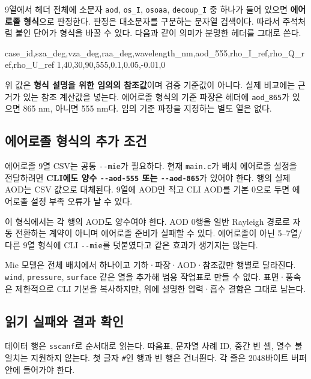 9열에서 헤더 전체에 소문자 \texttt{aod}, \texttt{os\_\allowbreak{}I}, \texttt{osoaa}, \texttt{decoup\_\allowbreak{}I} 중 하나가 들어 있으면 \textbf{에어로졸 형식}으로 판정한다. 판정은 대소문자를 구분하는 문자열 검색이다. 따라서 주석처럼 붙인 단어가 형식을 바꿀 수 있다. 다음과 같이 의미가 분명한 헤더를 그대로 쓴다.


\begin{ManualCode}
case_id,sza_deg,vza_deg,raa_deg,wavelength_nm,aod_555,rho_I_ref,rho_Q_ref,rho_U_ref
1,40,30,90,555,0.1,0.05,-0.01,0
\end{ManualCode}

위 값은 \textbf{형식 설명을 위한 임의의 참조값}이며 검증 기준값이 아니다. 실제 비교에는 근거가 있는 참조 계산값을 넣는다. 에어로졸 형식의 기준 파장은 헤더에 \texttt{aod\_\allowbreak{}865}가 있으면 865 nm, 아니면 555 nm다. 임의 기준 파장을 지정하는 별도 열은 없다.

\subsection{에어로졸 형식의 추가 조건}
\label{sec:auto:08_input_formats:3.3}
에어로졸 9열 CSV는 공통 \texttt{-\allowbreak{}-\allowbreak{}mie}가 필요하다. 현재 \texttt{main.\allowbreak{}c}가 배치 에어로졸 설정을 전달하려면 \textbf{CLI에도 양수 \texttt{-\allowbreak{}-\allowbreak{}aod-\allowbreak{}555} 또는 \texttt{-\allowbreak{}-\allowbreak{}aod-\allowbreak{}865}}가 있어야 한다. 행의 실제 AOD는 CSV 값으로 대체된다. 9열에 AOD만 적고 CLI AOD를 기본 0으로 두면 에어로졸 설정 부족 오류가 날 수 있다.

이 형식에서는 각 행의 AOD도 양수여야 한다. AOD 0행을 일반 Rayleigh 경로로 자동 전환하는 계약이 아니며 에어로졸 준비가 실패할 수 있다. 에어로졸이 아닌 5--7열/다른 9열 형식에 CLI \texttt{-\allowbreak{}-\allowbreak{}mie}를 덧붙였다고 같은 효과가 생기지는 않는다.

Mie 모델은 전체 배치에서 하나이고 기하·파장·AOD·참조값만 행별로 달라진다. \texttt{wind}, \texttt{pressure}, \texttt{surface} 같은 열을 추가해 범용 작업표로 만들 수 없다. 표면·풍속은 제한적으로 CLI 기본을 복사하지만, 위에 설명한 압력·흡수 결함은 그대로 남는다.

\subsection{읽기 실패와 결과 확인}
\label{sec:auto:08_input_formats:3.4}
데이터 행은 \texttt{sscanf}로 순서대로 읽는다. 따옴표, 문자열 사례 ID, 중간 빈 셀, 열수 불일치는 지원하지 않는다. 첫 글자 \texttt{\#}인 행과 빈 행은 건너뛴다. 각 줄은 2048바이트 버퍼 안에 들어가야 한다.


